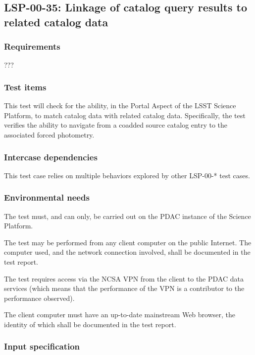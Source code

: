 \subsection{LSP-00-35: Linkage of catalog query results to related catalog data}
\label{lsp-00-35}

\subsubsection{Requirements}

???

\subsubsection{Test items}

This test will check for the ability, in the Portal Aspect of the LSST Science Platform, to match catalog data with related catalog data.  
Specifically, the test verifies the ability to navigate from a coadded source catalog entry to the associated forced photometry.


\subsubsection{Intercase dependencies}

This test case relies on multiple behaviors explored by other LSP-00-* test cases.


\subsubsection{Environmental needs}

The test must, and can only, be carried out on the PDAC instance of the Science Platform.

The test may be performed from any client computer on the public Internet.
The computer used, and the network connection involved, shall be documented in the test report.

The test requires access via the NCSA VPN from the client to the PDAC data services 
(which means that the performance of the VPN is a contributor to the performance observed).

The client computer must have an up-to-date mainstream Web browser, the identity of which shall be documented in the test report.


\subsubsection{Input specification}

